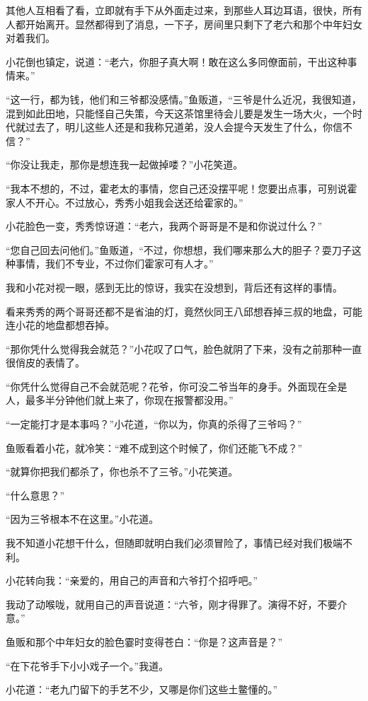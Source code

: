 其他人互相看了看，立即就有手下从外面走过来，到那些人耳边耳语，很快，所有人都开始离开。显然都得到了消息，一下子，房间里只剩下了老六和那个中年妇女对着我们。

小花倒也镇定，说道：“老六，你胆子真大啊！敢在这么多同僚面前，干出这种事情来。”

“这一行，都为钱，他们和三爷都没感情。”鱼贩道，“三爷是什么近况，我很知道，混到如此田地，只能怪自己失策，今天这茶馆里待会儿要是发生一场大火，一个时代就过去了，明儿这些人还是和我称兄道弟，没人会提今天发生了什么，你信不信？”

“你没让我走，那你是想连我一起做掉喽？”小花笑道。

“我本不想的，不过，霍老太的事情，您自己还没摆平呢！您要出点事，可别说霍家人不开心。不过放心，秀秀小姐我会送还给霍家的。”

小花脸色一变，秀秀惊讶道：“老六，我两个哥哥是不是和你说过什么？”

“您自己回去问他们。”鱼贩道，“不过，你想想，我们哪来那么大的胆子？耍刀子这种事情，我们不专业，不过你们霍家可有人才。”

我和小花对视一眼，感到无比的惊讶，我实在没想到，背后还有这样的事情。

看来秀秀的两个哥哥还都不是省油的灯，竟然伙同王八邱想吞掉三叔的地盘，可能连小花的地盘都想吞掉。

“那你凭什么觉得我会就范？”小花叹了口气，脸色就阴了下来，没有之前那种一直很俏皮的表情了。

“你凭什么觉得自己不会就范呢？花爷，你可没二爷当年的身手。外面现在全是人，最多半分钟他们就上来了，你现在报警都没用。”

“一定能打才是本事吗？”小花道，“你以为，你真的杀得了三爷吗？”

鱼贩看着小花，就冷笑：“难不成到这个时候了，你们还能飞不成？”

“就算你把我们都杀了，你也杀不了三爷。”小花笑道。

“什么意思？”

“因为三爷根本不在这里。”小花道。

我不知道小花想干什么，但随即就明白我们必须冒险了，事情已经对我们极端不利。

小花转向我：“亲爱的，用自己的声音和六爷打个招呼吧。”

我动了动喉咙，就用自己的声音说道：“六爷，刚才得罪了。演得不好，不要介意。”

鱼贩和那个中年妇女的脸色霎时变得苍白：“你是？这声音是？”

“在下花爷手下小小戏子一个。”我道。

小花道：“老九门留下的手艺不少，又哪是你们这些土鳖懂的。”

